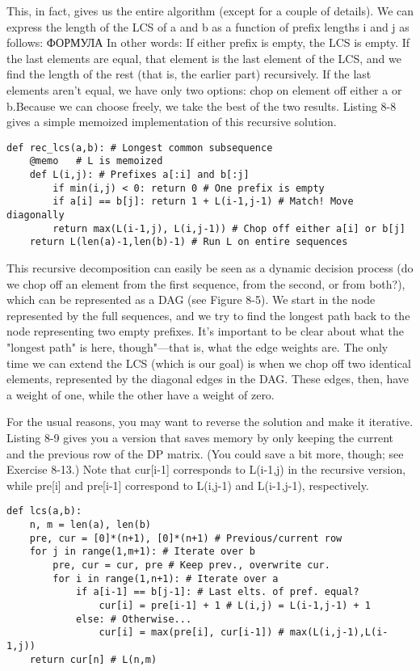 This, in fact, gives us the entire algorithm (except for a couple of details). We can express the length of the LCS of a and b as a function of prefix lengths i and j as follows:
ФОРМУЛА
In other words: If either prefix is empty, the LCS is empty. If the last elements are equal, that
element is the last element of the LCS, and we find the length of the rest (that is, the earlier part) recursively. If the last elements aren't equal, we have only two options: chop on element off either a or b.Because we can choose freely, we take the best of the two results. Listing 8-8 gives a simple memoized implementation of this recursive solution.
\begin{lstlisting}[caption={A Memoized Recursive Solution to the LCS Problem}]
def rec_lcs(a,b): # Longest common subsequence
    @memo   # L is memoized
    def L(i,j): # Prefixes a[:i] and b[:j]
        if min(i,j) < 0: return 0 # One prefix is empty
        if a[i] == b[j]: return 1 + L(i-1,j-1) # Match! Move diagonally
        return max(L(i-1,j), L(i,j-1)) # Chop off either a[i] or b[j]
    return L(len(a)-1,len(b)-1) # Run L on entire sequences
\end{lstlisting}    
This recursive decomposition can easily be seen as a dynamic decision process (do we chop off an
element from the first sequence, from the second, or from both?), which can be represented as a DAG (see Figure 8-5). We start in the node represented by the full sequences, and we try to find the longest path back to the node representing two empty prefixes. It's important to be clear about what the "longest path" is here, though"---that is, what the edge weights are. The only time we can extend the LCS (which is our goal) is when we chop off two identical elements, represented by the diagonal edges in the DAG. These edges, then, have a weight of one, while the other have a weight of zero.

For the usual reasons, you may want to reverse the solution and make it iterative. Listing 8-9 gives you a version that saves memory by only keeping the current and the previous row of the DP matrix. (You could save a bit more, though; see Exercise 8-13.) Note that cur[i-1] corresponds to L(i-1,j) in the recursive version, while pre[i] and pre[i-1] correspond to L(i,j-1) and L(i-1,j-1), respectively. 

\begin{lstlisting}[caption={An Iterative Solution to the Longest Common Subsequence (LCS)}]
def lcs(a,b):
    n, m = len(a), len(b)
    pre, cur = [0]*(n+1), [0]*(n+1) # Previous/current row
    for j in range(1,m+1): # Iterate over b
        pre, cur = cur, pre # Keep prev., overwrite cur.
        for i in range(1,n+1): # Iterate over a
            if a[i-1] == b[j-1]: # Last elts. of pref. equal?
                cur[i] = pre[i-1] + 1 # L(i,j) = L(i-1,j-1) + 1
            else: # Otherwise...
                cur[i] = max(pre[i], cur[i-1]) # max(L(i,j-1),L(i-1,j))
    return cur[n] # L(n,m)
\end{lstlisting}

